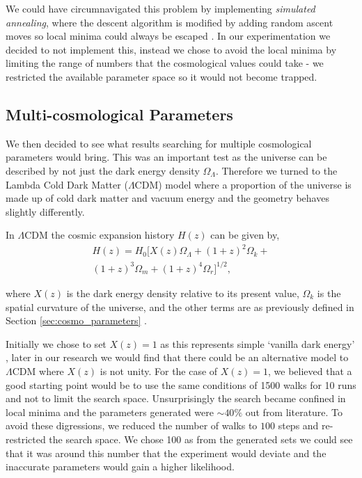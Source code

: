 \documentclass[twocolumn]{revtex4}
\begin{document}
{We could have circumnavigated this problem by implementing \textit{simulated annealing}, where the descent algorithm is modified by adding random ascent moves so local minima could always be escaped \cite{simulated_annealing}. In our experimentation we decided to not implement this, instead we chose to avoid the local minima by limiting the range of numbers that the cosmological values could take - we restricted the available parameter space so it would not become trapped.

\vspace{-3ex}
\subsection{Multi-cosmological Parameters} 
\vspace{-2ex}
We then decided to see what results searching for multiple cosmological parameters would bring. This was an important test as the universe can be described by not just the dark energy density $\Omega_\Lambda$. Therefore we turned to the Lambda Cold Dark Matter ($\Lambda$CDM) model where a proportion of the universe is made up of cold dark matter and vacuum energy \cite{mod_ast, quintessence} and the geometry behaves slightly differently. 

In $\Lambda$CDM the cosmic expansion history $H(z)$ can be given by, 
\begin{multline}
H(z)=H_0[X(z)\Omega_\Lambda+(1+z)^2\Omega_k+\\
(1+z)^3\Omega_m+(1+z)^4\Omega_r]^{1/2},
\label{eqn:expansion_history}
\end{multline}

where $X(z)$ is the dark energy density relative to its present value, $\Omega_k$ is the spatial curvature of the universe, and the other terms are as previously defined in Section \ref{sec:cosmo_parameters} \cite{cosmo_constraints}.

Initially we chose to set $X(z)=1$ as this represents simple `vanilla dark energy' \cite{cosmo_constraints}, later in our research we would find that there could be an alternative model to $\Lambda$CDM where $X(z)$ is not unity. For the case of $X(z)=1$, we believed that a good starting point would be to use the same conditions of 1500 walks for 10 runs and not to limit the search space. Unsurprisingly the search became confined in local minima and the parameters generated were $\sim40\%$ out from literature. To avoid these digressions, we reduced the number of walks to $100$ steps and re-restricted the search space. We chose 100 as from the generated sets we could see that it was around this number that the experiment would deviate and the inaccurate parameters would gain a higher likelihood.

}
\end{document}
